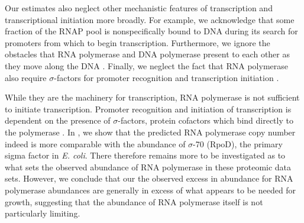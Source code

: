 Our estimates also neglect other mechanistic features of transcription and
transcriptional initiation more broadly. For example, we acknowledge that some
fraction of the RNAP pool is nonspecifically bound to DNA during its search for
promoters from which to begin transcription. Furthermore, we ignore the
obstacles that RNA polymerase and DNA polymerase present to each other as they
move along the DNA \citep{finkelstein2013}. Finally, we neglect the fact that
RNA polymerase also require $\sigma$-factors for promoter recognition and
transcription initiation \citep{browning2016}.

While they are the machinery for transcription, RNA polymerase is not
sufficient to initiate transcription. Promoter recognition and initiation of
transcription is dependent on the presence of $\sigma$-factors, protein
cofactors which bind directly to the polymerase \citep{browning2016}. In
, we show that the predicted RNA polymerase
copy number indeed is more comparable with the abundance of $\sigma$-70
(RpoD), the primary sigma factor in \textit{E. coli}. There therefore remains
more to be investigated as to what sets the observed abundance of RNA
polymerase in these proteomic data sets. However, we conclude that our
the observed excess in abundance for RNA polymerase
abundances are generally in excess of what appears to be needed for growth, suggesting
that the abundance of RNA polymerase itself is not particularly limiting.


